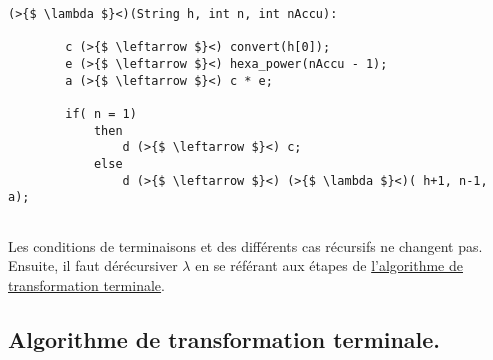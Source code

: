 \documentclass[a4paper, 11pt, oneside]{article}
\begin{document}
\begin{enumerate}
			\begin{lstlisting}[caption={lambda\_3}]
(>{$ \lambda $}<)(String h, int n, int nAccu):
				 
		c (>{$ \leftarrow $}<) convert(h[0]);
		e (>{$ \leftarrow $}<) hexa_power(nAccu - 1);
		a (>{$ \leftarrow $}<) c * e;
		
		if( n = 1)
			then 
				d (>{$ \leftarrow $}<) c;
			else
				d (>{$ \leftarrow $}<) (>{$ \lambda $}<)( h+1, n-1, a);
		
			\end{lstlisting}
				
					Les conditions de terminaisons et des différents cas récursifs ne changent pas.
					\\ Ensuite, il faut dérécursiver $\lambda$ en se référant aux étapes de \hyperref[terminale]{l'algorithme de transformation terminale}.
		\end{enumerate}	
		
		
		
		
	\subsection{Algorithme de transformation terminale.}\label{terminale}
	
\end{document}
